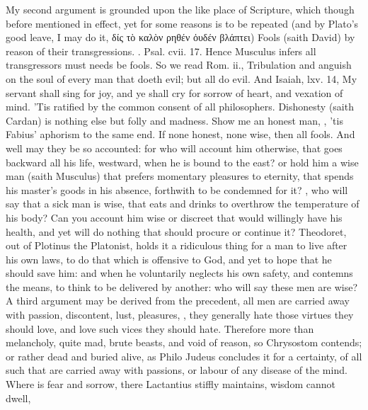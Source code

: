 {My second argument is grounded upon the like place of Scripture, which
though before mentioned in effect, yet for some reasons is to be
repeated (and by Plato's good leave, I may do it, \textgreek{δίς τὸ καλὸν
ρηθέν ὀυδέν βλάπτει}) Fools (saith David) by reason of their
transgressions. \etc{}. Psal. cvii. 17. Hence Musculus infers all
transgressors must needs be fools. So we read Rom. ii., Tribulation and
anguish on the soul of every man that doeth evil; but all do evil. And
Isaiah, lxv. 14, My servant shall sing for joy, and ye shall cry
for sorrow of heart, and vexation of mind. 'Tis ratified by the common
consent of all philosophers. Dishonesty (saith Cardan) is nothing else
but folly and madness.  Show me an
honest man, , 'tis Fabius' aphorism to the
same end. If none honest, none wise, then all fools. And well may they
be so accounted: for who will account him otherwise,  that goes backward all his
life, westward, when he is bound to the east? or hold him a wise man
(saith Musculus) that prefers momentary pleasures to eternity,
that spends his master's goods in his absence, forthwith to be
condemned for it? , who will say
that a sick man is wise, that eats and drinks to overthrow the
temperature of his body? Can you account him wise or discreet that
would willingly have his health, and yet will do nothing that should
procure or continue it? Theodoret, out of Plotinus the Platonist,
holds it a ridiculous thing for a man to live after his own laws, to do
that which is offensive to God, and yet to hope that he should save
him: and when he voluntarily neglects his own safety, and contemns the
means, to think to be delivered by another: who will say these men are
wise?
A third argument may be derived from the precedent, all men are
carried away with passion, discontent, lust, pleasures, \etc{}, they
generally hate those virtues they should love, and love such vices they
should hate. Therefore more than melancholy, quite mad, brute beasts,
and void of reason, so Chrysostom contends; or rather dead and buried
alive, as  Philo Judeus concludes it for a certainty, of all such
that are carried away with passions, or labour of any disease of the
mind. Where is fear and sorrow, there Lactantius stiffly
maintains, wisdom cannot dwell,

}
